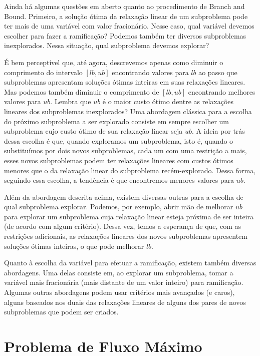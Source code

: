 \documentclass[]{article}
\numberwithin{equation}{section}
\begin{document}
Ainda há algumas questões em aberto quanto ao procedimento de Branch and Bound.
Primeiro, a solução ótima da relaxação linear de um subproblema pode ter mais de uma variável com valor
fracionário.
Nesse caso, qual variável devemos escolher para fazer a ramificação?
Podemos também ter diversos subproblemas inexplorados.
Nessa situação, qual subproblema devemos explorar?

É bem perceptível que, até agora, descrevemos apenas como diminuir o comprimento do intervalo $[lb, ub]$
encontrando valores para $lb$ ao passo que subproblemas apresentam soluções ótimas inteiras em suas
relaxações lineares.
Mas podemos também diminuir o comprimento de $[lb, ub]$ encontrando melhores valores para $ub$.
Lembra que $ub$ é o maior custo ótimo dentre as relaxações lineares dos subproblemas inexplorados?
Uma abordagem clássica para a escolha do próximo subproblema a ser explorado consiste em sempre escolher
um subproblema cujo custo ótimo de sua relaxação linear seja $ub$.
A ideia por trás dessa escolha é que, quando exploramos um subproblema, isto é, quando o substituímos
por dois novos subproblemas, cada um com uma restrição a mais, esses novos subproblemas podem ter
relaxações lineares com custos ótimos menores que o da relaxação linear do subproblema recém-explorado.
Dessa forma, seguindo essa escolha, a tendência é que encontremos menores valores para $ub$.

Além da abordagem descrita acima, existem diversas outras para a escolha de qual subproblema explorar.
Podemos, por exemplo, abrir mão de melhorar $ub$ para explorar um subproblema cuja relaxação linear
esteja próxima de ser inteira (de acordo com algum critério).
Dessa vez, temos a esperança de que, com as restrições adicionais, as relaxações lineares dos novos
subproblemas apresentem soluções ótimas inteiras, o que pode melhorar $lb$.

Quanto à escolha da variável para efetuar a ramificação, existem também diversas abordagens.
Uma delas consiste em, ao explorar um subproblema, tomar a variável mais fracionária (mais distante de
um valor inteiro) para ramificação.
Algumas outras abordagens podem usar critérios mais avançados (e caros), alguns baseados nos duais das
relaxações lineares de alguns dos pares de novos subproblemas que podem ser criados.

\section{Problema de Fluxo Máximo}
\end{document}
